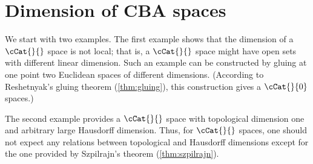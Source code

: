 \begin{comment}
\parit{Proof 2.}
According to \ref{LinDim+-f}, there is a point $p\in\spc{L}$, such that $\T_p\iso\RR$;
that is, $\Sigma_p$ consists of two directions $\xi_+$, $\xi_-$ on angle $\pi$.
Both of directions $\xi_+$, $\xi_-$ have to be geodesic;
otherwise the set of geodesic directions $\Sigma_p'$ would not be dense in $\Sigma_p$.
Let $\gamma_+$ and $\gamma_-$ be maximal geodesics in directions $\xi_+$ and $\xi_-$ correspondingly.

The geodesics $\gamma_+$ and $\gamma_-$ cover $\spc{L}$ completely;
that follows sinse $\spc{L}$ is geodesic (\ref{cor:dim>proper}) and since geodesics in $\spc{L}$ do not bifurcate (\ref{thm:g-split}).
It is easy to see that only following cases can occur
\begin{itemize}
\item both $\gamma_+$ and $\gamma_-$ are defined on $[0,\infty)$.
In this case $\spc{L}\iso\RR$.
\item $\gamma_+$ is defined on closed interval, say $[0,a]$ and $\gamma_-$ is defined of an infinite interval $[0,\infty)$ (or vise versa).
In this case $\spc{L}\iso\RR_{\ge0}$.
\item both $\gamma_+$ and $\gamma_-$ are defined on closed intervals, say $[0,a]$ and $[0,b]$ and $\gamma_+(a)\not=\gamma_-(b)$.
In this case $\spc{L}\iso[0,a+b]$.
\item both $\gamma_+$ and $\gamma_-$ are defined on one closed interval, say $[0,a]$ and $\gamma_+(a)=\gamma_-(a)$.
In this case, $\spc{L}\iso\tfrac{a}{\pi}\blow\SS^1$.
\end{itemize}
Hence the result.\qeds
\end{comment}





\section{Dimension of CBA spaces}\label{sec:dim-cba}

We start with two examples.
The first example shows that the dimension of a $\cCat{}{}$ space is not local;
that is, a $\cCat{}{}$ space might have open sets with different linear dimension.
Such an example can be constructed by gluing at one point two Euclidean spaces of different dimensions.
(According to Reshetnyak's gluing theorem (\ref{thm:gluing}), this construction gives a $\cCat{}{0}$ spaces.)

The second example provides a $\cCat{}{}$ space 
with topological dimension one and arbitrary large Hausdorff dimension.
Thus, for $\cCat{}{}$ spaces, one should not expect any relations between topological and Hausdorff dimensions except for the one provided by Szpilrajn's theorem (\ref{thm:szpilrajn}).

